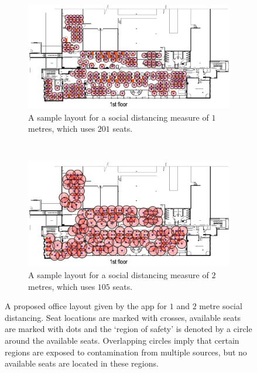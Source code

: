\documentclass[11pt,a4paper]{article}
\begin{document}
\begin{figure}[ht!]
\centering

\begin{subfigure}[h]{0.9\linewidth}
\centering
\includegraphics[width = \linewidth]{1m_overlay.png}
\caption{A sample layout for a social distancing measure of $1$ metres, which uses $201$ seats.}
\label{OneMetre}
\end{subfigure}
~
\begin{subfigure}[h]{0.9\linewidth}
\centering
\includegraphics[width = \linewidth]{2m_overlay.png}
\caption{A sample layout for a social distancing measure of $2$ metres, which uses $105$ seats.}
\label{TwoMetre}
\end{subfigure}
\caption{A proposed office layout given by the app for $1$ and $2$ metre social distancing. Seat locations are marked with crosses, available seats are marked with dots and the `region of safety' is denoted by a circle around the available seats. Overlapping circles imply that certain regions are exposed to contamination from multiple sources, but no available seats are located in these regions. }
\label{Demonstration_pics}
\end{figure}
\end{document}
